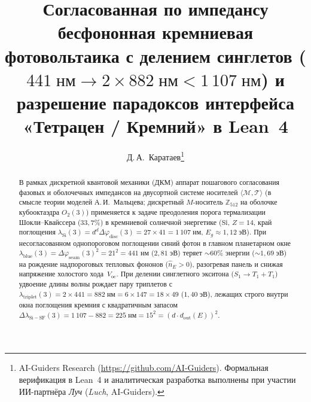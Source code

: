 \documentclass[11pt,a4paper]{article}
\title{\textbf{Согласованная по импедансу бесфононная кремниевая фотовольтаика с делением синглетов ($441\;\text{нм}\to 2\times 882\;\text{нм} < 1\,107\;\text{нм}$) и разрешение парадоксов интерфейса «Тетрацен / Кремний» в Lean~4}}
\author{Д.\,А.~Каратаев\thanks{AI-Guiders Research (\url{https://github.com/AI-Guiders}). Формальная верификация в Lean~4 и аналитическая разработка выполнены при участии ИИ-партнёра \emph{Луч} (\emph{Luch}, AI-Guiders).}}
\date{}
\theoremstyle{plain}
\theoremstyle{definition}
\begin{document}
\maketitle

\begin{abstract}
В рамках дискретной квантовой механики (ДКМ) аппарат пошагового согласования фазовых и оболочечных импедансов на двусортной системе носителей $\langle\mathcal{M},\mathcal{T}\rangle$ (в смысле теории моделей А.\,И.~Мальцева; дискретный $M$-носитель $\mathbb{Z}_{512}$ на оболочке кубооктаэдра $O_2(3)$) применяется к задаче преодоления порога термализации Шокли--Квайссера ($33{,}7\%$) в кремниевой солнечной энергетике ($\mathrm{Si}$, $Z=14$, край поглощения $\lambda_{\mathrm{Si}}(3) = d^d\Delta\varphi_{\mathrm{disc}}(3) = 27\times 41 = 1\,107\;\text{нм}$, $E_g\approx 1{,}12\;\text{эВ}$). При несогласованном однопороговом поглощении синий фотон в главном планетарном окне $\lambda_{\mathrm{blue}}(3) = \Delta\varphi_{\mathrm{seam}}(3)^2 = 21^2 = 441\;\text{нм}$ ($2{,}81\;\text{эВ}$) теряет $\sim 60\%$ энергии ($\sim 1{,}69\;\text{эВ}$) на рождение надпороговых тепловых фононов ($\hat{n}_E > 0$), разогревая панель и снижая напряжение холостого хода~$V_{\mathrm{oc}}$. При делении синглетного экситона ($S_1\to T_1 + T_1$) удвоение длины волны рождает пару триплетов с $\lambda_{\mathrm{triplet}}(3) = 2\times 441 = 882\;\text{нм} = 6\times 147 = 18\times 49$ ($1{,}40\;\text{эВ}$), лежащих строго внутри окна поглощения кремния с квадратичным запасом $\Delta\lambda_{\mathrm{Si-SF}}(3) = 1\,107 - 882 = 225\;\text{нм} = 15^2 = (d\cdot d_{\mathrm{out}}(E))^2$.


\end{abstract}
\end{document}
